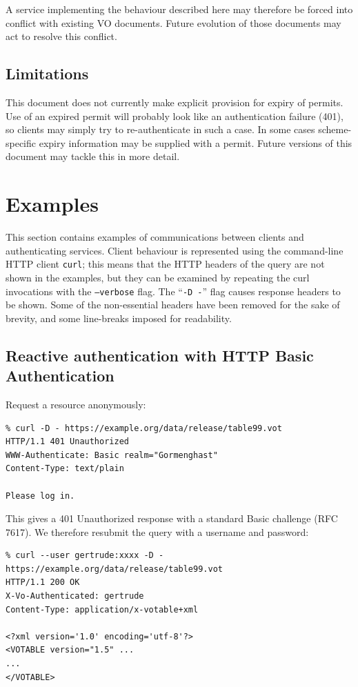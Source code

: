 \documentclass[11pt,a4paper]{ivoa}
\newcommand{\rfc}[1]{RFC\,#1}
\begin{document}
A service implementing the behaviour described here may therefore
be forced into conflict with existing VO documents.
Future evolution of those documents may act to resolve this conflict.

\subsection{Limitations}

This document does not currently make explicit provision for
expiry of permits.
Use of an expired permit will probably look like an authentication
failure (401), so clients may simply try to re-authenticate in
such a case.
In some cases scheme-specific expiry information may be supplied with a permit.
Future versions of this document may tackle this in more detail.


\section{Examples}

This section contains examples of communications between clients
and authenticating services.
Client behaviour is represented using the
command-line HTTP client {\tt curl};
this means that the HTTP headers of the query
are not shown in the examples,
but they can be examined by repeating the curl invocations
with the {\tt --verbose} flag.
The ``{\tt -D -}'' flag causes response headers to be shown.
Some of the non-essential headers have been removed for the sake
of brevity, and some line-breaks imposed for readability.

\subsection{Reactive authentication with HTTP Basic Authentication}


Request a resource anonymously:
{\footnotesize
\begin{verbatim}
% curl -D - https://example.org/data/release/table99.vot
HTTP/1.1 401 Unauthorized
WWW-Authenticate: Basic realm="Gormenghast"
Content-Type: text/plain

Please log in.
\end{verbatim}
}

\noindent
This gives a 401 Unauthorized response
with a standard Basic challenge (\rfc{7617}).
We therefore resubmit the query with a username and password:
{\footnotesize
\begin{verbatim}
% curl --user gertrude:xxxx -D - https://example.org/data/release/table99.vot
HTTP/1.1 200 OK
X-Vo-Authenticated: gertrude
Content-Type: application/x-votable+xml

<?xml version='1.0' encoding='utf-8'?>
<VOTABLE version="1.5" ...
...
</VOTABLE>
\end{verbatim}
}
\end{document}
